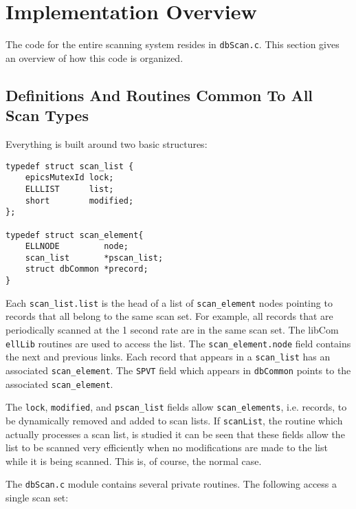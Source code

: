 \section{Implementation Overview}

The code for the entire scanning system resides in \verb|dbScan.c|.
This section gives an overview of how this code is organized.

\subsection{Definitions And Routines Common To All Scan Types}

Everything is built around two basic structures:

\begin{verbatim}
typedef struct scan_list {
    epicsMutexId lock;
    ELLLIST      list;
    short        modified;
};

typedef struct scan_element{
    ELLNODE         node;
    scan_list       *pscan_list;
    struct dbCommon *precord;
}
\end{verbatim}

Each \verb|scan_list.list| is the head of a list of \verb|scan_element| nodes pointing to records that all belong to the same scan set.
For example, all records that are periodically scanned at the 1 second rate are in the same scan set.
The libCom \verb|ellLib| routines are used to access the list.
The \verb|scan_element.node| field contains the next and previous links.
Each record that appears in a \verb|scan_list| has an associated \verb|scan_element|.
The \verb|SPVT| field which appears in \verb|dbCommon| points to the associated \verb|scan_element|.

The \verb|lock|, \verb|modified|, and \verb|pscan_list| fields allow \verb|scan_elements|, i.e. records, to be dynamically removed and added to scan lists.
If \verb|scanList|, the routine which actually processes a scan list, is studied it can be seen that these fields allow the list to be scanned very efficiently when no modifications are made to the list while it is being scanned.
This is, of course, the normal case.

The \verb|dbScan.c| module contains several private routines.
The following access a single scan set: 

